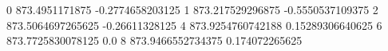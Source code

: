 0 873.4951171875 -0.2774658203125
1 873.217529296875 -0.5550537109375
2 873.5064697265625 -0.26611328125
4 873.9254760742188 0.15289306640625
6 873.7725830078125 0.0
8 873.9466552734375 0.174072265625
